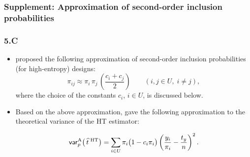 \documentclass{my_eth_beamer}
\numberwithin{equation}{section}
\newcommand{\NR}{5}
\begin{document}
\subsubsection{Supplement: Approximation of second-order inclusion probabilities}
\begin{frame}
    \frametitle{\NR.\insertsubsectionnumber C~\insertsubsubsection}
    \begin{itemize}
    \setlength{\itemsep}{8pt}
        \item \citet{brewer_2000} proposed the following \alert{approximation}
            of second-order inclusion probabilities (for high-entropy)
            designs:
            \begin{equation*}
                \pi_{ij} \approx \pi_i \, \pi_j \, \left(\frac{c_i +
                    c_j}{2}\right) \qquad (i,j \in U, \; i \neq j),
            \end{equation*}
            \noindent where the choice of the constants $c_i$, $i\in U$, is
            discussed below.
        \item Based on the above approximation, \citet{brewer_2000} gave the
            following approximation to the theoretical \alert{variance of the
            HT estimator}:

            \vspace{-0.5em}

            \begin{equation*}
                \mathsf{var}_p^{\mathrm{A}}\big(\,\widehat{t}^{\;\mathrm{HT}}\big) = \sum_{i \in U} \pi_i
                    \big(1 - c_i \pi_i\big)
                    \left(\frac{y_i}{\pi_i} - \frac{t_y}{n} \right)^2.
            \end{equation*}
    \end{itemize}
\end{frame}
\end{document}
